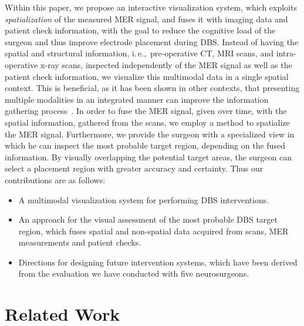 \documentclass{vgtc}                          %
\begin{document}
Within this paper, we propose an interactive visualization system, which exploits {\it spatialization} of the measured MER signal, and fuses it with imaging data and patient check information, with the goal to reduce the cognitive load of the surgeon and thus improve electrode placement during DBS. Instead of having the spatial and structural information, i.\,e.,~pre-operative CT, MRI scans, and intra-operative x-ray scans, inspected independently of the MER signal as well as the patient check information, we visualize this multimodal data in a single spatial context. This is beneficial, as it has been shown in other contexts, that presenting multiple modalities in an integrated manner can improve the information gathering process~\cite{10.1109/BIOMEDVIS.1995.10008}. In order to fuse the MER signal, given over time, with the spatial information, gathered from the scans, we employ a method to spatialize the MER signal. Furthermore, we provide the surgeon with a specialized view in which he can inspect the most probable target region, depending on the fused information. By visually overlapping the potential target areas, the surgeon can select a placement region with greater accuracy and certainty. Thus our contributions are as follows:

\begin{itemize}
\item{A multimodal visualization system for performing DBS interventions.}
\item{An approach for the visual assessment of the most probable DBS target region, which fuses spatial and non-spatial data acquired from scans, MER measurements and patient checks.}
\item{Directions for designing future intervention systems, which have been derived from the evaluation we have conducted with five neurosurgeons.}
\end{itemize}



\section{Related Work}\label{sec:related}
\end{document}
